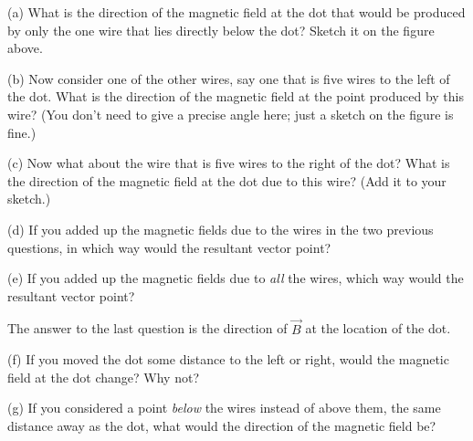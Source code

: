(a) What is the direction of the magnetic
field at the dot that would be produced by only the one wire that lies directly below
the dot?  Sketch it on the figure above.

(b) Now consider one of the other wires,
say one that is five wires to the left of the dot.
What is the direction of the magnetic field at the point produced by this 
wire? (You don't need to give a precise angle here; just a sketch on the figure is fine.)

(c) Now what about the wire that is five wires to the right of the dot?
What is the direction of the magnetic field at the dot due to this wire?  (Add it to your sketch.)

(d) If you added up the magnetic fields due to the wires in the two
previous questions, in which way would the resultant vector point?
\answerspace{0.5in}

(e) If you added up the magnetic fields due to \textit{all} the wires,
which way would the resultant vector point?
\answerspace{0.5in}

The answer to the last question is the direction of $\vec B$ at 
the location of the dot.

(f) If you moved the dot some distance to the left or right,
would the magnetic field at the dot change? Why not?
\answerspace{0.5in}

(g) If you considered a point \textit{below} the wires instead of
above them, the same distance away as the dot, what would the
direction of the magnetic field be?
\answerspace{0.5in}

